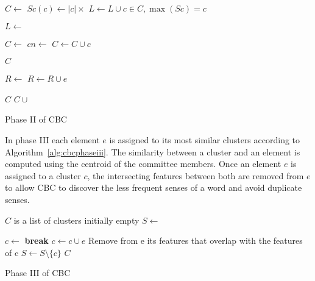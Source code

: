 \begin{algorithm}
\begin{algorithmic}
    \State $C \gets$ 
      \State $Sc(c) \gets |c| \times $ 
    \EndFor
    \State $L \gets L \cup c \in C, \max(Sc) = c$
  \EndFor

  \State $L \gets$ 

  \State $C \gets$ 
    \State $cn \gets$ 
      \State $C \gets C \cup c$
    \EndIf
  \EndFor

    \State \Return $C$
  \EndIf

  \State $R \gets$ 
      \State $R \gets R \cup e$
    \EndIf
  \EndFor

    \State \Return $C$
  \Else
    \State \Return $C \cup$ 
  \EndIf
\EndFunction
\end{algorithmic}
\caption{\label{alg:cbcphaseii} Phase II of CBC}
\end{algorithm}


In phase III each element $e$ is assigned to its most similar clusters
according to Algorithm~\ref{alg:cbcphaseiii}. The similarity between a cluster
and an element is computed using the centroid of the committee members. Once an
element $e$ is assigned to a cluster $c$, the intersecting features between
both are removed from $e$ to allow \ac{CBC} to discover the less frequent
senses of a word and avoid duplicate senses.

\begin{algorithm}
\begin{algorithmic}
\State $C$ is a list of clusters initially empty
  \State $S \gets$ 

    \State $c \gets$ 
      \State \textbf{break}
    \EndIf
     \State $c \gets c \cup e$
     \State Remove from e its features that overlap with the features of c
   \EndIf
   \State $S \gets S \setminus \{c\}$
  \EndWhile
  \State \Return $C$
\EndFunction
\end{algorithmic}
\caption{\label{alg:cbcphaseiii} Phase III of CBC}
\end{algorithm}

